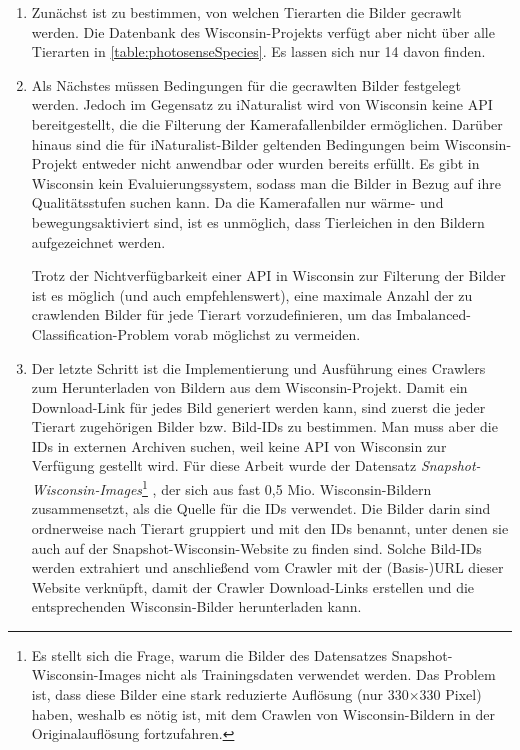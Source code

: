 \begin{enumerate}
	\item Zunächst ist zu bestimmen, von welchen Tierarten die Bilder gecrawlt werden. Die Datenbank des Wisconsin-Projekts verfügt aber nicht über alle Tierarten in \autoref{table:photosenseSpecies}. Es lassen sich nur 14 davon finden.
	
	\item Als Nächstes müssen Bedingungen für die gecrawlten Bilder festgelegt werden. Jedoch im Gegensatz zu iNaturalist wird von Wisconsin keine API bereitgestellt, die die Filterung der Kamerafallenbilder ermöglichen. Darüber hinaus sind die für iNaturalist-Bilder geltenden Bedingungen beim Wisconsin-Projekt entweder nicht anwendbar oder wurden  bereits erfüllt. Es gibt in Wisconsin kein Evaluierungssystem, sodass man die Bilder in Bezug auf ihre Qualitätsstufen suchen kann. Da die Kamerafallen nur wärme- und bewegungsaktiviert sind, ist es unmöglich, dass Tierleichen in den Bildern aufgezeichnet werden. 
	
	Trotz der Nichtverfügbarkeit einer API in Wisconsin zur Filterung der Bilder ist es möglich (und auch empfehlenswert), eine maximale Anzahl der zu crawlenden Bilder für jede Tierart vorzudefinieren, um das Imbalanced-Classification-Problem vorab möglichst zu vermeiden. %
	
	\item Der letzte Schritt ist die Implementierung und Ausführung eines Crawlers zum Herunterladen von Bildern aus dem Wisconsin-Projekt. Damit ein Download-Link für jedes Bild generiert werden kann, sind zuerst die jeder Tierart zugehörigen Bilder bzw. Bild-IDs zu bestimmen.	Man muss aber die IDs in externen Archiven suchen, weil keine API von Wisconsin zur Verfügung gestellt wird. Für diese Arbeit wurde der Datensatz \emph{Snapshot-Wisconsin-Images}\footnote{Es stellt sich die Frage, warum die Bilder des Datensatzes Snapshot-Wisconsin-Images nicht als Trainingsdaten verwendet werden. Das Problem ist, dass diese Bilder eine stark reduzierte Auflösung (nur 330$\times$330 Pixel) haben, weshalb es nötig ist, mit dem Crawlen von Wisconsin-Bildern in der Originalauflösung fortzufahren.} \cite{WCSOrigin}, der sich aus fast 0,5 Mio. Wisconsin-Bildern zusammensetzt, als die Quelle für die IDs verwendet. Die Bilder darin sind ordnerweise nach Tierart gruppiert und mit den IDs benannt, unter denen sie auch auf der Snapshot-Wisconsin-Website zu finden sind. Solche Bild-IDs werden extrahiert und anschließend vom Crawler mit der (Basis-)URL dieser Website verknüpft, damit der Crawler Download-Links erstellen und die entsprechenden Wisconsin-Bilder herunterladen kann.
	
\end{enumerate}


